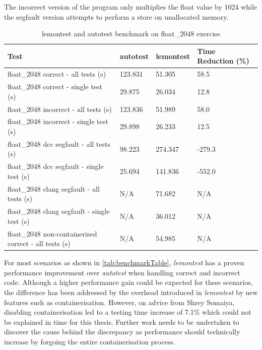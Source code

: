 \documentclass[hidelinks]{report}
\begin{document}
The incorrect version of the program only multiplies the float value by 1024 while the segfault version attempts to perform a store on unallocated memory.

\begin{table}[h]
	\centering
	\begin{tabular}{llll}
		\toprule
		\textbf{Test} & \textbf{autotest} & \textbf{lemontest} & \textbf{Time Reduction (\%)}\\
		\midrule
		float\_2048 correct - all tests (s)   	 & 123.831  & 51.305 & 58.5 \\
		float\_2048 correct - single test (s)    & 29.875  & 26.034 & 12.8 \\
		float\_2048 incorrect - all tests (s)    & 123.836  & 51.989 & 58.0 \\
		float\_2048 incorrect - single test (s)  & 29.898  & 26.233 &  12.5 \\
		float\_2048 dcc segfault - all tests (s)	 & 98.223  & 274.347 & -279.3 \\
		float\_2048 dcc segfault - single test (s)   & 25.694  & 141.836 & -552.0 \\
		float\_2048 clang segfault - all tests (s)	 & N/A  & 71.682 & N/A \\
		float\_2048 clang segfault - single test (s) & N/A  & 36.012 & N/A \\
		float\_2048 non-containerised correct - all tests (s) & N/A  & 54.985 & N/A \\
		\bottomrule
	\end{tabular}
	\caption{lemontest and autotest benchmark on float\_2048 exercise}
	\label{tab:benchmarkTable}
\end{table}

For most scenarios as shown in \autoref{tab:benchmarkTable}, \textit{lemontest} has a proven performance improvement over \textit{autotest} when handling correct and incorrect code. Although a higher performance gain could be expected for these scenarios, the difference has been addressed by the overhead introduced in \textit{lemontest} by new features such as containerisation. However, on advice from Shrey Somaiya, disabling containerisation led to a testing time increase of 7.1\% which could not be explained in time for this thesis. Further work needs to be undertaken to discover the cause behind the discrepancy as performance should technically increase by forgoing the entire containerisation process.
\end{document}
